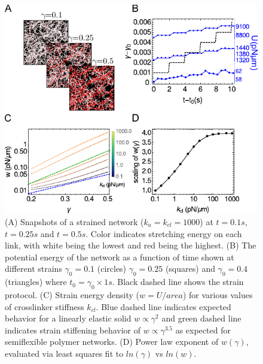 \documentclass[12pt]{article}
\begin{document}
\begin{figure}[H]
  \centering
  \includegraphics[scale=1.2]{figs/elasticity/shear_result.pdf}
  \caption{%
    \label{fig:stress}%
    (A) Snapshots of a strained network ($k_a=k_{cl}=1000$) at $t=0.1s$, 
    $t=0.25s$ and $t=0.5s$. Color indicates stretching energy on each link, with
    white being the lowest and red being the highest. 
    (B) The potential energy of the network as a function of time shown at
    different strains $\gamma_0=0.1$ (circles) $\gamma_0=0.25$ (squares) and
    $\gamma_0=0.4$ (triangles) where $t_0=\gamma_0\times 1s$. Black dashed line
    shows the strain protocol.   
    (C) Strain energy density ($w=U/area$) for various values of crosslinker
    stiffness $k_{cl}$. Blue dashed line indicates expected behavior for a 
    linearly elastic solid $w\propto \gamma^2$ and green dashed line indicates
    strain stiffening behavior of $w\propto \gamma^{3.5}$ as expected 
    for semiflexible polymer networks\cite{gardel2004,lin2010}.
   (D) Power law exponent of $w(\gamma)$, evaluated via least squares fit to
   $ln(\gamma)$ vs $ln(w)$. 
  }
\end{figure}
\end{document}
